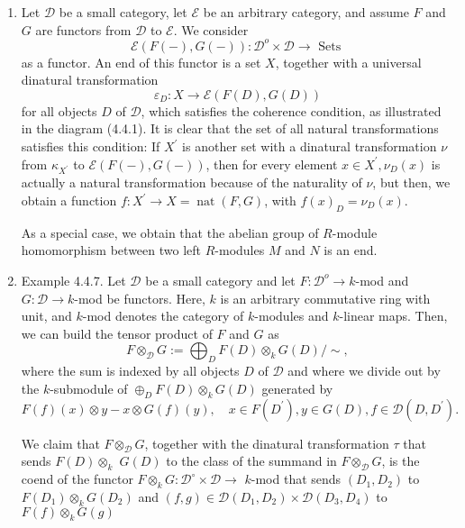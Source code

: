 \begin{example}
\begin{example}\begin{enumerate}
    \item Let $\mathcal{D}$ be a small category, let $\mathcal{E}$ be an arbitrary category, and assume $F$ and $G$ are functors from $\mathcal{D}$ to $\mathcal{E}$. We consider
        $$
        \mathcal{E}(F(-), G(-)): \mathcal{D}^o \times \mathcal{D} \rightarrow \text { Sets }
        $$
        as a functor. An end of this functor is a set $X$, together with a universal dinatural transformation
        $$
        \varepsilon_D: X \rightarrow \mathcal{E}(F(D), G(D))
        $$
        for all objects $D$ of $\mathcal{D}$, which satisfies the coherence condition, as illustrated in the diagram (4.4.1). It is clear that the set of all natural transformations satisfies this condition: If $X^{\prime}$ is another set with a dinatural transformation $\nu$ from $\kappa_{X^{\prime}}$ to $\mathcal{E}(F(-), G(-))$, then for every element $x \in X^{\prime}, \nu_D(x)$ is actually a natural transformation because of the naturality of $\nu$, but then, we obtain a function $f: X^{\prime} \rightarrow X=\operatorname{nat}(F, G)$, with $f(x)_D=\nu_D(x)$.
        
        As a special case, we obtain that the abelian group of $R$-module homomorphism between two left $R$-modules $M$ and $N$ is an end.   
        \item Example 4.4.7. Let $\mathcal{D}$ be a small category and let $F: \mathcal{D}^o \rightarrow k$-mod and $G: \mathcal{D} \rightarrow k$-mod be functors. Here, $k$ is an arbitrary commutative ring with unit, and $k$-mod denotes the category of $k$-modules and $k$-linear maps. Then, we can build the tensor product of $F$ and $G$ as
        $$
        F \otimes_{\mathcal{D}} G:=\bigoplus_D F(D) \otimes_k G(D) / \sim,
        $$
        where the sum is indexed by all objects $D$ of $\mathcal{D}$ and where we divide out by the $k$-submodule of $\oplus_D F(D) \otimes_k G(D)$ generated by
        $$
        F(f)(x) \otimes y-x \otimes G(f)(y), \quad x \in F\left(D^{\prime}\right), y \in G(D), f \in \mathcal{D}\left(D, D^{\prime}\right) .
        $$
        
        We claim that $F \otimes_{\mathcal{D}} G$, together with the dinatural transformation $\tau$ that sends $F(D) \otimes_k$ $G(D)$ to the class of the summand in $F \otimes_{\mathcal{D}} G$, is the coend of the functor $F \otimes_k G: \mathcal{D}^{\circ} \times \mathcal{D} \rightarrow$ $k$-mod that sends $\left(D_1, D_2\right)$ to $F\left(D_1\right) \otimes_k G\left(D_2\right)$ and $(f, g) \in \mathcal{D}\left(D_1, D_2\right) \times \mathcal{D}\left(D_3, D_4\right)$ to $F(f) \otimes_k G(g)$
\end{enumerate}
\end{example}


\end{example}
